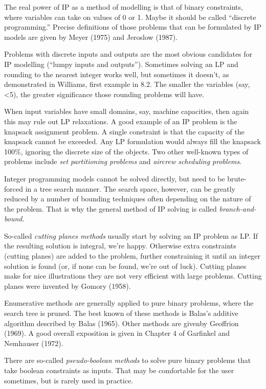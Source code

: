 \documentclass[13pt, letterpaper, twoside]{book}
\begin{document}
The real power of IP as a method of modelling is that of binary constraints, where variables can take on values of 0 or 1. Maybe it should be called ``discrete programming.'' Precise definitions of those problems that can be formulated by IP models are given by Meyer (1975) and Jeroslow (1987). 

Problems with discrete inputs and outputs are the most obvious candidates for IP modelling (``lumpy inputs and outputs''). Sometimes solving an LP and rounding to the nearest integer works well, but sometimes it doesn't, as demonstrated in Williams, first example in 8.2. The smaller the variables (say, <5), the greater significance those rounding problems will have. 

When input variables have small domains, say, machine capacities, then again this may rule out LP relaxations. A good example of an IP problem is the knapsack assignment problem. A single constraint is that the capacity of the knapsack cannot be exceeded. Any LP formulation would always fill the knapsack 100\%, ignoring the discrete size of the objects. Two other well-known types of problems include \textit{set partitioning problems} and \textit{aircrew scheduling problems}. 

Integer programming models cannot be solved directly, but need to be brute-forced in a tree search manner. The search space, however, can be greatly reduced by a number of bounding techniques often depending on the nature of the problem. That is why the general method of IP solving is called \textit{branch-and-bound}.

So-called \textit{cutting planes methods} usually start by solving an IP problem as LP. If the resulting solution is integral, we're happy. Otherwise extra constraints (cutting planes) are added to the problem, further constraining it until an integer solution is found (or, if none can be found, we're out of luck). Cutting planes make for nice illustrations they are not very efficient with large problems. Cutting planes were invented by Gomory (1958).

Enumerative methods are generally applied to pure binary problems, where the search tree is pruned. The best known of these methods is Balas's additive algorithm described by Balas (1965). Other methods are givenby Geoffrion (1969). A good overall exposition is given in Chapter 4 of Garfinkel and Nemhauser (1972).

There are so-called \textit{pseudo-boolean methods} to solve pure binary problems that take boolean constraints as inputs. That may be comfortable for the user sometimes, but is rarely used in practice.
\end{document}
